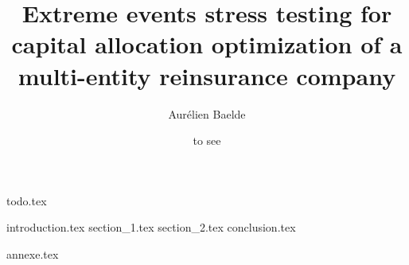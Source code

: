 \documentclass[a4paper, 12pt]{report}
\title{Extreme events stress testing for capital allocation optimization of a multi-entity reinsurance company}
\author{Aurélien Baelde}
\date{to see}
\begin{document}
\begin{titlepage}
\maketitle
\end{titlepage}

{todo.tex}
\newpage

\tableofcontents
\newpage

{introduction.tex}
{section_1.tex}
{section_2.tex}
{conclusion.tex}

\appendix
{annexe.tex}
\end{document}
